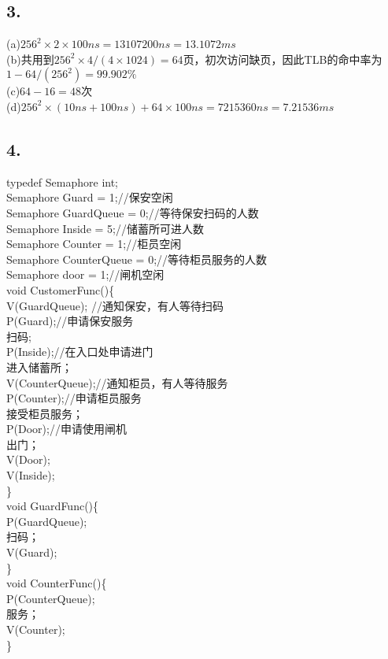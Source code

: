 \documentclass[UTF8]{ctexart}
\begin{document}
\subsection*{3.}
(a)$256^2\times 2\times 100ns=13107200ns=13.1072ms$\\
(b)共用到$256^2\times 4/(4\times 1024)=64$页，初次访问缺页，因此TLB的命中率为$1-64/(256^2)=99.902\%$\\
(c)$64-16=48$次\\
(d)$256^2\times(10ns+100ns)+64\times 100ns=7215360ns=7.21536ms$\\
\subsection*{4.}
typedef Semaphore int;\\
Semaphore Guard = 1;//保安空闲\\
Semaphore GuardQueue = 0;//等待保安扫码的人数\\
Semaphore Inside = 5;//储蓄所可进人数\\
Semaphore Counter = 1;//柜员空闲\\
Semaphore CounterQueue = 0;//等待柜员服务的人数\\
Semaphore door = 1;//闸机空闲\\
void CustomerFunc()\{\\
V(GuardQueue); //通知保安，有人等待扫码\\
P(Guard);//申请保安服务\\
扫码;\\
P(Inside);//在入口处申请进门\\
进入储蓄所；\\
V(CounterQueue);//通知柜员，有人等待服务\\
P(Counter);//申请柜员服务\\
接受柜员服务；\\
P(Door);//申请使用闸机\\
出门；\\
V(Door);\\
V(Inside);\\
\}\\
void GuardFunc()\{\\
P(GuardQueue);\\
扫码；\\
V(Guard);  \\  
\}\\
void CounterFunc()\{\\
P(CounterQueue);\\
服务；\\
V(Counter);\\
\}\\
\end{document}
